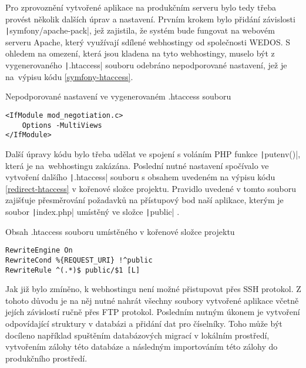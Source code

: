 Pro zprovoznění vytvořené aplikace na produkčním serveru bylo tedy třeba provést několik dalších úprav a nastavení. Prvním krokem bylo přidání závislosti \texttt|symfony/apache-pack|, jež zajistila, že systém bude fungovat na webovém serveru Apache, který využívají sdílené webhostingy od společnosti WEDOS. S ohledem na omezení, která jsou kladena na tyto webhostingy, muselo být z vygenerovaného \texttt|.htaccess| souboru odebráno nepodporované nastavení, jež je na~výpisu kódu \ref{symfony-htaccess}. \cite{symfony_wedos}

\begin{listing}[h]
    \caption{Nepodporované nastavení ve vygenerovaném .htaccess souboru}\label{symfony-htaccess}
    \begin{verbatim}
<IfModule mod_negotiation.c>
    Options -MultiViews
</IfModule>
    \end{verbatim}
\end{listing}

\vspace{-2mm}

Další úpravy kódu bylo třeba udělat ve spojení s voláním PHP funkce \texttt|putenv()|, která je na~webhostingu zakázána. Poslední nutné nastavení spočívalo ve vytvoření dalšího \texttt|.htaccess| souboru s obsahem uvedeném na výpisu kódu \ref{redirect-htaccess} v kořenové složce projektu. Pravidlo uvedené v tomto souboru zajišťuje přesměrování požadavků na přístupový bod naší aplikace, kterým je soubor \texttt|index.php| umístěný ve složce \texttt|public| \cite{symfony_wedos}.

\begin{listing}[h]
    \caption{Obsah .htaccess souboru umístěného v kořenové složce projektu}\label{redirect-htaccess}
    \begin{verbatim}
RewriteEngine On
RewriteCond %{REQUEST_URI} !^public
RewriteRule ^(.*)$ public/$1 [L]
    \end{verbatim}
\end{listing}

Jak již bylo zmíněno, k webhostingu není možné přistupovat přes SSH protokol. Z tohoto důvodu je na něj nutné nahrát všechny soubory vytvořené aplikace včetně jejích závislostí ručně přes FTP protokol. Posledním nutným úkonem je vytvoření odpovídající struktury v databázi a přidání dat pro číselníky. Toho může být docíleno například spuštěním databázových migrací v lokálním prostředí, vytvořením zálohy této databáze a následným importováním této zálohy do produkčního prostředí.
